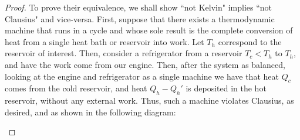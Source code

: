 \documentclass[12pt, a4paper, oneside, openright, titlepage]{book}
\begin{document}
\begin{proof}
    To prove their equivalence, we shall show ``not Kelvin" implies ``not Clausius" and vice-versa. First, suppose that there exists a thermodynamic machine that runs in a cycle and whose sole result is the complete conversion of heat from a single heat bath or reservoir into work. Let $T_h$ correspond to the reservoir of interest. Then, consider a refrigerator from a reservoir $T_c < T_h$ to $T_h$, and have the work come from our engine. Then, after the system as balanced, looking at the engine and refrigerator as a single machine we have that heat $Q_c$ comes from the cold reservoir, and heat $Q_h - Q_h'$ is deposited in the hot reservoir, without any external work. Thus, such a machine violates Clausius, as desired, and as shown in the following diagram:
        \begin{center}
            \begin{tikzpicture}[x=0.75pt,y=0.75pt,yscale=-1,xscale=1]


\end{tikzpicture}
\end{center}
\end{proof}
\end{document}

